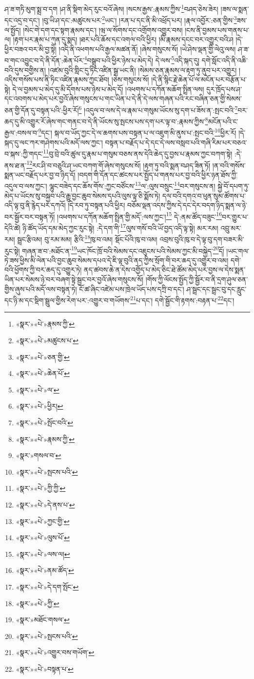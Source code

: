 ཤ་ཟ་གཏི་མུག་སྨྲ་བ་དག །ཤ་ནི་སྡིག་མེད་རུང་བའོ་ཞེས། །སངས་རྒྱས་:རྣམས་ཀྱིས་\footnote{«སྣར་»«པེ་»རྣམས་ཀྱི་}བཤད་ཅེས་ཟེར། །ཟས་ལ་སྨན་དང་འདྲ་བ་དང་། །བུ་ཡི་ཤ་དང་:མཚུངས་པར་\footnote{«སྣར་»«པེ་»མཚུངས་པ་}ཡང་། །རན་པ་དང་ནི་མི་འཕྲོད་པར། །རྣལ་འབྱོར་:ཅན་གྱིས་\footnote{«སྣར་»«པེ་»ཅན་གྱི་}ཟས་ལ་སྤྱོད། །སེང་གེ་དག་དང་སྟག་རྣམས་དང་། །ཝ་ལ་སོགས་དང་འགྲོགས་འགྱུར་བས། །ངས་ནི་བྱམས་པས་གནས་པ་ལ། །རྟག་པར་རྣམ་པ་ཀུན་དུ་སྨད། །ཐར་པའི་ཆོས་དང་འགལ་བའི་ཕྱིར། །མི་རྣམས་དངང་བར་འགྱུར་བའི་ཤ །དེ་ཕྱིར་བཟའ་བར་མི་བྱ་སྟེ། །འདི་ནི་འཕགས་པའི་རྒྱལ་མཚན་ནོ། །ཞེས་གསུངས་སོ། །ཡེ་ཤེས་ལྡན་གྱི་ལེའུ་ལས། ཤ་ཟ་བ་གང་འབྱུང་བ་དེ་ནི་དོན་:ཆེན་པོར་\footnote{«སྣར་»«པེ་»ཆེན་པོ་}བསྒྲུབ་པའི་ཕྱིར་ཉེས་པ་མེད་དེ། དེ་ལས་\footnote{«སྣར་»«པེ་»ལ་}འདི་སྐད་དུ། དགེ་སློང་འདི་ནི་འཆི་བའི་དུས་བགྱིས་ན། །འཛམ་བུའི་གླིང་དུ་ཏིང་འཛིན་སྒྲ་ཡང་ནི། །སེམས་ཅན་རྣམས་ལ་རྟག་ཏུ་ནུབ་པར་འགྱུར། །འདིས་གསོས་པས་ནི་ཏིང་འཛིན་རྣམས་ཀྱང་ཐོབ། །ཅེས་གསུངས་སོ། །དེ་ནི་སྙིང་རྗེ་ཆེན་པོ་ལ་མངོན་པར་བརྩོན་པ་སྟེ། དེ་ལ་བྱམས་པ་མེད་དུ་མི་དོགས་པས་ཉེས་པ་མེད་དོ། །འཕགས་པ་དཀོན་མཆོག་སྤྲིན་ལས། དུར་ཁྲོད་པས་ཤ་དང་འབགས་པ་མེད་པར་བྱའོ་ཞེས་གསུངས་པ་གང་ཡིན་པ་དེ་ནི་དེ་ལས་གཞན་པའི་རང་བཞིན་ཅན་གྱི་སེམས་ཅན་གྱི་དོན་དུ་བསྟན་པའི་:ཕྱིར་རོ།\footnote{«སྣར་»«པེ་»ཕྱིར།} །འདུལ་བ་ལས་དེ་ལ་རྣམ་པ་གསུམ་ཡོངས་སུ་དག་པ་ཟོས་ན་:སྤང་བའི་\footnote{«སྣར་»«པེ་»སྤོང་བའི་}བར་ཆད་དུ་མི་འགྱུར་རོ་ཞེས་གང་གནང་བ་དེ་ནི་ཡོངས་སུ་སྤངས་པས་དག་པར་ལྟ་བ་:རྣམས་ཀྱིས་\footnote{«སྣར་»«པེ་»རྣམས་ཀྱི་}མངོན་པའི་ང་རྒྱལ་:བསལ་བ་\footnote{«སྣར་»གསལ་བ་}དང་། སྐལ་བ་ཡོད་ཀྱང་དེ་ལ་ཆགས་པས་བསྟན་པ་ལ་འཇུག་མི་ནུས་པ་:སྤང་བའི་\footnote{«སྣར་»«པེ་»སྤངས་པའི་}ཕྱིར་རོ། །དེ་སྐད་དུ་ལང་ཀར་གཤེགས་པའི་མདོ་ལས་ཀྱང་། བསྟན་པ་བརྗོད་པ་དེ་དང་དེ་ལས་བསླབ་པའི་གཞི་རིམ་པར་བཅའ་བ་སྐས་:ཀྱི་གདང་\footnote{«སྣར་»«པེ་»ཀྱི་ཀྱི་}བུ་བྲེ་བའི་ཚུལ་དུ་རྣམ་པ་གསུམ་བཅས་ནས་དེའི་ཆེད་དུ་བྱས་པ་རྣམས་ཀྱང་བཀག་སྟེ། :དེ་ནས་ཐ་ན་\footnote{«སྣར་»«པེ་»དེ་ནས་པ་}རང་ཤི་བ་བཅུའི་ཤ་ཡང་བཀག་གོ་ཞེས་གསུངས་སོ། །རྟག་ཏུ་བའི་སྨན་བཤད་ཟིན་ཏོ། །ན་བའི་གསོས་སྨན་ཡང་བརྗོད་པར་བྱ་བ་ཉིད་དོ། །བདག་གི་དོན་དང་ཚངས་པར་སྤྱོད་པ་གནས་པར་བྱ་བའི་ཕྱིར་ཉན་ཐོས་ཀྱི་འདུལ་བ་ལས་ཀྱང་། ལྷུང་བཟེད་དང་ཆོས་གོས་:ཀྱང་བཙོངས་\footnote{«སྣར་»«པེ་»ཀྱང་གྱི་}ལ་:ལུས་བསྲུང་\footnote{«སྣར་»«པེ་»ལུས་པོ་}བར་གསུངས་ན། སྐྱེ་བོ་དཔག་ཏུ་མེད་པ་ཡོངས་སུ་བསྐྱབ་པའི་རྒྱུ་བྱང་ཆུབ་སེམས་དཔའི་ལུས་ལྟ་ཅི་སྨོས་ཏེ། དལ་བའི་དགའ་བ་ཕུན་སུམ་ཚོགས་པ་འདི་ལྟ་བུ་ནི་རྙེད་པར་དཀའོ། །དེ་རབ་ཏུ་བསྟན་པའི་ཕྱིར། བཅོམ་ལྡན་འདས་ཀྱིས་དེ་དང་དེར་བདག་ཉིད་སྨན་ལ་ཉེ་བར་སྦྱོར་བར་བསྟན་ཏོ། །འཕགས་པ་དཀོན་མཆོག་སྤྲིན་གྱི་མདོ་:ལས་ཀྱང་།\footnote{«སྣར་»«པེ་»ལས་ལ།} དེ་:ནམ་ཚོད་བཟུང་\footnote{«སྣར་»«པེ་»ནམ་ཚོད་}བར་གྱུར་པ་དེའི་ཚེ། ཉི་ཚོད་ཡོད་དམ་མེད་ཀྱང་རུང་སྟེ། :དེ་དག་གི་\footnote{«སྣར་»«པེ་»དེ་དག་སྤོང་}ལུས་གསོ་བའི་ཡོ་བྱད་འདི་ལྟ་སྟེ། མར་རམ། འབྲུ་མར་རམ། སྦྲང་རྩིའམ། བུ་རམ་མམ། རྩིའི་\footnote{«སྣར་»«པེ་»ཀྱི་}ཁུ་བ་འམ། སྡོང་པོའི་ཁུ་བ་འམ། འབྲས་བུའི་ཁུ་བ་དེ་ལྟ་བུ་དག་བཟར་མི་རུང་སྟེ། གཞན་ཟ་བ་:མཐོང་ན་\footnote{«སྣར་»མཐོང་གསལ་}ཡང་ཁོང་ཁྲོ་བའི་སེམས་དང་འཇུངས་པའི་སེམས་ཀྱང་མི་བསྐྱེད་\footnote{«སྣར་»«པེ་»སྤངས་པའི་}དོ། །ཡང་གལ་ཏེ་ཟས་ཕྱིས་མི་ལེན་པའི་བྱང་ཆུབ་སེམས་དཔའ་དེ་ཇི་ལྟ་བུའི་ནད་ཀྱིས་སྲོག་གི་བར་ཆད་དུ་འགྱུར་བ་འམ། དགེ་བའི་ཕྱོགས་ཀྱི་བར་ཆད་དུ་འགྱུར་ཏེ། ནད་ཚབས་ཆེ་ན་དེས་འགྱོད་པ་མེད་ཅིང་ཐེ་ཚོམ་མེད་པར་བྱས་ལ་དེས་སྨན་ཡིན་པར་སེམས་ཉེ་བར་བཞག་སྟེ་སྦྱང་བར་བྱའོ་ཞེས་གསུངས་སོ། །གོས་ཀྱི་ལོངས་སྤྱོད་ཀྱི་སྦྱོར་བ་ནི་དྲག་ཤུལ་ཅན་གྱིས་ཞུས་པའི་མདོ་ལས་བསྟན་ཏེ། ངོ་ཚ་ཞིང་འཛེམ་པས་ཁྲེལ་ཡོད་པས་དཀྲི་བ་དང་། ཤ་སྦྲང་དང་སྦྲང་བུ་དང་རླུང་དང་ཉི་མ་དང་སྡིག་སྦྲུལ་གྱིས་རེག་པར་:འགྱུར་བ་གཡོགས་\footnote{«སྣར་»«པེ་»འགྱུར་བས་གཡོག་}པ་དང་། དགེ་སྦྱོང་གི་རྟགས་:བརྟན་པ་\footnote{«སྣར་»«པེ་»བསྟན་པ་}དང་། 